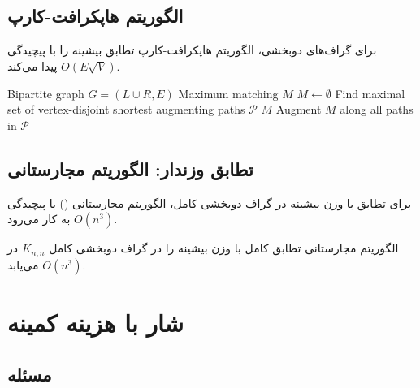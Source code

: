 \documentclass{matinbook}
\begin{document}
    \subsection{الگوریتم هاپکرافت-کارپ}
    
    برای گراف‌های دوبخشی،
    الگوریتم هاپکرافت-کارپ
    تطابق بیشینه را با پیچیدگی $O(E\sqrt{V})$
    پیدا می‌کند.
    
    \begin{latin}
        \begin{algorithm}
            \begin{algorithmic}[1]
                \Require Bipartite graph $G = (L \cup R, E)$
                \Ensure Maximum matching $M$
                \State $M \gets \emptyset$
                \Repeat
                \State Find maximal set of vertex-disjoint
                shortest augmenting paths $\mathcal{P}$
                \State \Return $M$
                \EndIf
                \State Augment $M$ along all paths in $\mathcal{P}$
            \end{algorithmic}
        \end{algorithm}
    \end{latin}
    
    \subsection{تطابق وزندار: الگوریتم مجارستانی}
    
    برای تطابق با وزن بیشینه در گراف دوبخشی کامل،
    الگوریتم مجارستانی
    () با پیچیدگی $O(n^{3})$
    به کار می‌رود.
    
    \begin{theorem}
        الگوریتم مجارستانی تطابق کامل با
        وزن بیشینه را در گراف دوبخشی کامل
        $K_{n,n}$ در $O(n^{3})$ می‌یابد.
        \label{thm:hungarian}
    \end{theorem}
    
    \section{شار با هزینه کمینه}
    
    \subsection{مسئله}
    
\end{document}
